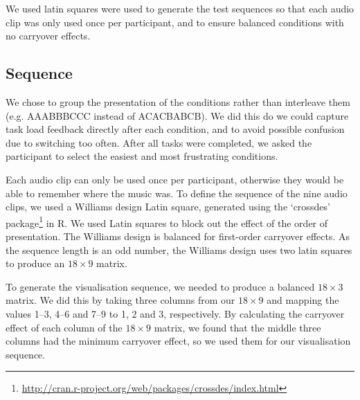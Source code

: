 We used latin squares were used to generate the test sequences so that each audio clip was only used once per
participant, and to ensure balanced conditions with no carryover effects.


\subsection{Sequence}\label{sec:studysequence}

We chose to group the presentation of the conditions rather than interleave them (e.g. AAABBBCCC instead of ACACBABCB).
We did this do we could capture task load feedback directly after each condition, and to avoid possible confusion due
to switching too often.  After all tasks were completed, we asked the participant to select the easiest and most
frustrating conditions.

Each audio clip can only be used once per participant, otherwise they would be able to remember where the music was.
To define the sequence of the nine audio clips, we used a Williams design Latin square, generated using the `crossdes'
package\footnote{\url{http://cran.r-project.org/web/packages/crossdes/index.html}} in R.  We used Latin squares to
block out the effect of the order of presentation. The Williams design is balanced for first-order carryover effects.
As the sequence length is an odd number, the Williams design uses two latin squares to produce an $18\times9$ matrix.

To generate the visualisation sequence, we needed to produce a balanced $18\times3$ matrix. We did this by taking three
columns from our $18\times9$ and mapping the values 1--3, 4--6 and 7--9 to 1, 2 and 3, respectively.  By calculating
the carryover effect of each column of the $18\times9$ matrix, we found that the middle three columns had the minimum
carryover effect, so we used them for our visualisation sequence.

